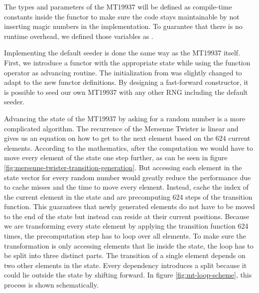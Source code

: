 \documentclass{stdlocal}
\begin{document}
    The types and parameters of the MT19937 will be defined as compile-time constants inside the functor to make sure the code stays maintainable by not inserting magic numbers in the implementation.
    To guarantee that there is no runtime overhead, we defined those variables as .

    Implementing the default seeder is done the same way as the MT19937 itself.
    First, we introduce a functor with the appropriate state while using the function operator as advancing routine.
    The initialization from \textcite{kneusel2018} was slightly changed to adapt to the new functor definitions.
    By designing a fast-forward constructor, it is possible to seed our own MT19937 with any other RNG including the default seeder.

    Advancing the state of the MT19937 by asking for a random number is a more complicated algorithm.
    The recurrence of the Mersenne Twister is linear and gives us an equation on how to get to the next element based on the $624$ current elements.
    According to the mathematics, after the computation we would have to move every element of the state one step further, as can be seen in figure \ref{fig:mersenne-twister-transition-generation}.
    But accessing each element in the state vector for every random number would greatly reduce the performance due to cache misses and the time to move every element.
    Instead, \citeauthor{matsumoto1998} cache the index of the current element in the state and are precomputing 624 steps of the transition function.
    This guarantees that newly generated elements do not have to be moved to the end of the state but instead can reside at their current positions.
    Because we are transforming every state element by applying the transition function 624 times, the precomputation step has to loop over all elements.
    To make sure the transformation is only accessing elements that lie inside the state, the loop has to be split into three distinct parts.
    The transition of a single element depends on two other elements in the state.
    Every dependency introduces a split because it could lie outside the state by shifting forward.
    In figure \ref{fig:mt-loop-scheme}, this process is shown schematically.
\end{document}
